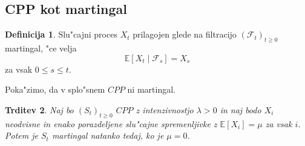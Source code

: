 \documentclass[12pt, a4paper, reqno]{amsart}
\theoremstyle{definition} %
\newtheorem{definicija}{Definicija}[section]
\theoremstyle{plain} %
\newtheorem{trditev}[definicija]{Trditev}
\newcommand{\R}{\mathbb{R}}
\newcommand{\E}{\mathbb{E}}
\newcommand{\F}{\mathcal{F}}
\newcommand{\Prob}{\mathbb{P}}
\newcommand{\1}{\mathds{1}}
\begin{document}
%
%
%
%
%
%
%
%

    \subsection{CPP kot martingal}

        \begin{definicija}
            Slu"cajni proces $X_t$ prilagojen glede na filtracijo $(\F_t)_{t\geq0}$
            martingal, "ce velja 
            $$
                \E\left[X_t\mid\F_s\right] = X_s
            $$
            za vsak $0\leq s \leq t$.
            \label{def:martingal}
        \end{definicija}

        Poka"zimo, da v splo"snem $CPP$ ni martingal.

        \begin{trditev}
            Naj bo $(S_t)_{t\geq0}$ $CPP$ z intenzivnostjo $\lambda>0$ in naj bodo $X_i$ neodvisne
            in enako porazdeljene slu"cajne spremenljivke z $\E\left[X_i\right] = \mu$ za vsak $i$.
            Potem je $S_t$ martingal natanko tedaj, ko je $\mu = 0$.
            \label{trd:CPPnimartingal}
        \end{trditev}
\end{document}
